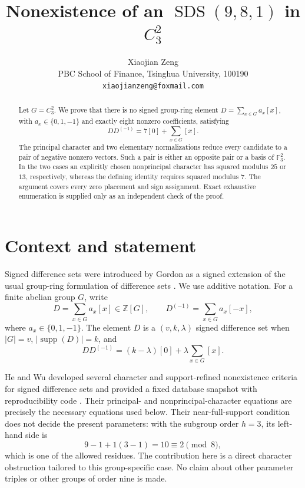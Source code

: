 \documentclass[11pt]{article}
\title{Nonexistence of an $\operatorname{SDS}(9,8,1)$ in $C_3^2$}
\author{Xiaojian Zeng\\
PBC School of Finance, Tsinghua University, 100190\\
\texttt{xiaojianzeng@foxmail.com}}
\date{}
\newcommand{\F}{\mathbb F}
\newcommand{\Z}{\mathbb Z}
\newcommand{\supp}{\operatorname{supp}}
\begin{document}
\maketitle

\begin{abstract}
Let $G=C_3^2$.  We prove that there is no signed group-ring element
$D=\sum_{x\in G}a_x[x]$, with $a_x\in\{0,1,-1\}$ and exactly eight
nonzero coefficients, satisfying
\[
 DD^{(-1)}=7[0]+\sum_{x\in G}[x].
\]
The principal character and two elementary normalizations reduce every
candidate to a pair of negative nonzero vectors.  Such a pair is either an
opposite pair or a basis of $\F_3^2$.  In the two cases an explicitly chosen
nonprincipal character has squared modulus $25$ or $13$, respectively,
whereas the defining identity requires squared modulus $7$.  The argument
covers every zero placement and sign assignment.  Exact exhaustive
enumeration is supplied only as an independent check of the proof.
\end{abstract}

\section{Context and statement}

Signed difference sets were introduced by Gordon as a signed extension of
the usual group-ring formulation of difference sets
\cite{Gordon2023}.  We use additive notation.  For a finite abelian group
$G$, write
\[
 D=\sum_{x\in G}a_x[x]\in\Z[G],\qquad
 D^{(-1)}=\sum_{x\in G}a_x[-x],
\]
where $a_x\in\{0,1,-1\}$.  The element $D$ is a
$(v,k,\lambda)$ signed difference set when $|G|=v$,
$|\supp(D)|=k$, and
\begin{equation}
 DD^{(-1)}=(k-\lambda)[0]+\lambda\sum_{x\in G}[x].
\end{equation}

He and Wu developed several character and support-refined nonexistence
criteria for signed difference sets and provided a fixed database snapshot
with reproducibility code \cite{HeRepository2026,HeWu2026}.  Their
principal- and nonprincipal-character equations are precisely the
necessary equations used below.  Their near-full-support condition does not
decide the present parameters: with the subgroup order $h=3$, its left-hand
side is
\[
 9-1+1(3-1)=10\equiv 2\pmod 8,
\]
which is one of the allowed residues.  The contribution here is a direct
character obstruction tailored to this group-specific case.  No
claim about other parameter triples or other groups of order nine is made.
\end{document}
